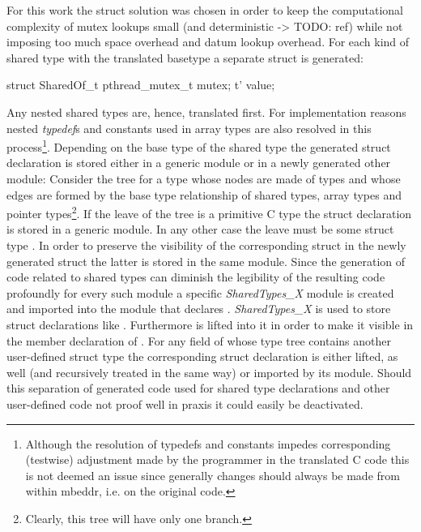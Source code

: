 For this work the struct solution was chosen in order to keep the computational complexity of mutex lookups small (and deterministic -> TODO: ref) while not imposing too much space overhead and datum lookup overhead. For each kind of shared type  with the translated basetype  a separate struct is generated:
\begin{ccode}
struct SharedOf_t {
  pthread_mutex_t mutex;
  t' value;
}
\end{ccode}
Any nested shared types are, hence, translated first. For implementation reasons nested \textit{typedef}s and constants used in array types are also resolved in this process\footnote{Although the resolution of typedefs and constants impedes corresponding (testwise) adjustment made by the programmer in the translated C code this is not deemed an issue since generally changes should always be made from within mbeddr, i.e. on the original code.}. Depending on the base type of the shared type the generated struct declaration is stored either in a generic module or in a newly generated other module: Consider the tree for a type  whose nodes are made of types and whose edges are formed by the base type relationship of shared types, array types and pointer types\footnote{Clearly, this tree will have only one branch.}. 
If the leave of the tree is a primitive C type the struct declaration is stored in a generic module. In any other case the leave must be some struct type . In order to preserve the visibility of the corresponding struct in the newly generated struct  the latter is stored in the same module. Since the generation of code related to shared types can diminish the legibility of the resulting code profoundly for every such module a specific \textit{SharedTypes\_X} module is created and imported into the module that declares . \textit{SharedTypes\_X} is used to store struct declarations like . Furthermore  is lifted into it in order to make it visible in the member declaration  of . For any field of  whose type tree contains another user-defined struct type the corresponding struct declaration is either lifted, as well (and recursively treated in the same way) or imported by its module. Should this separation of generated code used for shared type declarations and other user-defined code not proof well in praxis it could easily be deactivated.
